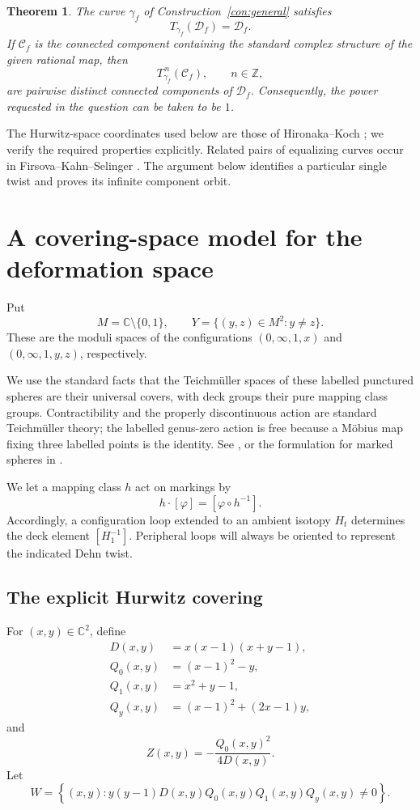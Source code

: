 \documentclass[11pt]{article}
\newcommand{\C}{\mathbb C}
\newcommand{\Z}{\mathbb Z}
\newcommand{\Def}{\mathcal D}
\newtheorem{theorem}{Theorem}[section]
\theoremstyle{definition}
\theoremstyle{remark}
\begin{document}
\begin{theorem}\label{thm:main}
The curve $\gamma_f$ of Construction~\ref{con:general} satisfies
\[
T_{\gamma_f}(\Def_f)=\Def_f.
\]
If $\mathcal C_f$ is the connected component containing the standard
complex structure of the given rational map, then
\[
T_{\gamma_f}^{\,n}(\mathcal C_f),\qquad n\in\Z,
\]
are pairwise distinct connected components of $\Def_f$.
Consequently, the power requested in the question can be taken to be
$1$.
\end{theorem}

The Hurwitz-space coordinates used below are those of
Hironaka--Koch \cite[Proposition~3.1]{HK}; we verify the required
properties explicitly.  Related pairs of equalizing curves occur in
Firsova--Kahn--Selinger \cite[Section~9, case~(12b), arXiv version]{FKS}.
The argument below identifies a particular single twist and proves
its infinite component orbit.

\section{A covering-space model for the deformation space}

Put
\[
M=\C\setminus\{0,1\},\qquad
Y=\{(y,z)\in M^2:y\ne z\}.
\]
These are the moduli spaces of the configurations
$(0,\infty,1,x)$ and $(0,\infty,1,y,z)$, respectively.

We use the standard facts that the Teichm\"uller spaces of these
labelled punctured spheres are their universal covers, with deck
groups their pure mapping class groups.  Contractibility and the
properly discontinuous action are standard Teichm\"uller theory;
the labelled genus-zero action is free because a M\"obius map fixing
three labelled points is the identity.  See
\cite[Chapters~10 and~12]{FM}, or the formulation for marked spheres in
\cite[Section~2.2]{HK}.

We let a mapping class $h$ act on markings by
\[
h\cdot[\varphi]=[\varphi\circ h^{-1}].
\]
Accordingly, a configuration loop extended to an ambient isotopy
$H_t$ determines the deck element $[H_1^{-1}]$.
Peripheral loops will always be oriented to represent the indicated
Dehn twist.

\subsection{The explicit Hurwitz covering}

For $(x,y)\in\C^2$, define
\[
\begin{split}
D(x,y)&=x(x-1)(x+y-1),\\
Q_0(x,y)&=(x-1)^2-y,\\
Q_1(x,y)&=x^2+y-1,\\
Q_y(x,y)&=(x-1)^2+(2x-1)y,
\end{split}
\]
and
\begin{equation}\label{eq:Z}
Z(x,y)=-\frac{Q_0(x,y)^2}{4D(x,y)}.
\end{equation}
Let
\begin{equation}\label{eq:W}
W=
\left\{(x,y):
y(y-1)D(x,y)Q_0(x,y)Q_1(x,y)Q_y(x,y)\ne0
\right\}.
\end{equation}
\end{document}
